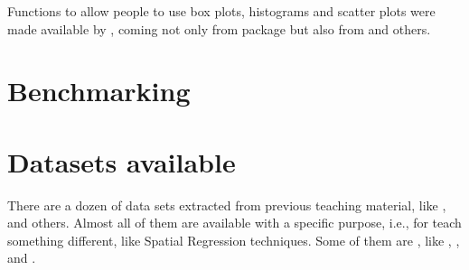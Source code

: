 \documentclass[article]{jss}
\begin{document}
Functions to allow people to use box plots, histograms and scatter plots
were made available by , coming not only from 
package but also from  and others.

\section{Benchmarking}\label{benchmarking}

\section{Datasets available}\label{datasets-available}

There are a dozen of data sets extracted from previous teaching
material, like ,  and others. Almost all of
them are available with a specific purpose, i.e., for teach something
different, like Spatial Regression techniques. Some of them are
, like ,
,  and
.
\end{document}
